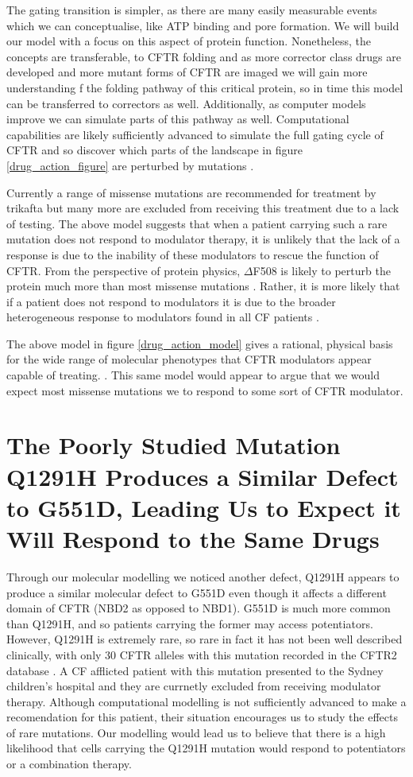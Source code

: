 The gating transition is simpler, as there are many easily measurable events which we can conceptualise, like ATP binding and pore formation. We will build our model with a focus on this aspect of protein function. Nonetheless, the concepts are transferable, to CFTR folding and as more corrector class drugs are developed and more mutant forms of CFTR are imaged we will gain more understanding f the folding pathway of this critical protein, so in time this model can be transferred to correctors as well. Additionally, as computer models improve we can simulate parts of this pathway as well. Computational capabilities are likely sufficiently advanced to simulate the full gating cycle of CFTR and so discover which parts of the landscape in figure \ref{drug_action_figure} are perturbed by mutations \cite{}. 

Currently a range of missense mutations are recommended for treatment by trikafta but many more are excluded from receiving this treatment due to a lack of testing. The above model suggests that when a patient carrying such a rare mutation does not respond to modulator therapy, it is unlikely that the lack of a response is due to the inability of these modulators to rescue the function of CFTR. From the perspective of protein physics, $\Delta$F508 is likely to perturb the protein much more than most missense mutations \cite{}. Rather, it is more likely that if a patient does not respond to modulators it is due to the broader heterogeneous response to modulators found in all CF patients \cite{}. 

The above model in figure \ref{drug_action_model} gives a rational, physical basis for the wide range of molecular phenotypes that CFTR modulators appear capable of treating. . This same model would appear to argue that we would expect most missense mutations we to respond to some sort of CFTR modulator. 

\section{The Poorly Studied Mutation Q1291H Produces a Similar Defect to G551D, Leading Us to Expect it Will Respond to the Same Drugs}

Through our molecular modelling we noticed another defect, Q1291H appears to produce a similar molecular defect to G551D even though it affects a different domain of CFTR (NBD2 as opposed to NBD1). G551D is much more common than Q1291H, and so patients carrying the former may access potentiators. However, Q1291H is extremely rare, so rare in fact it has not been well described clinically, with only 30 CFTR alleles with this mutation recorded in the CFTR2 database \cite{cftr2}. A CF afflicted patient with this mutation presented to the Sydney children's hospital and they are currnetly excluded from receiving modulator therapy. Although computational modelling is not sufficiently advanced to make a recomendation for this patient, their situation encourages us to study the effects of rare mutations. Our modelling would lead us to believe that there is a high likelihood that cells carrying the Q1291H mutation would respond to potentiators or a combination therapy. 

